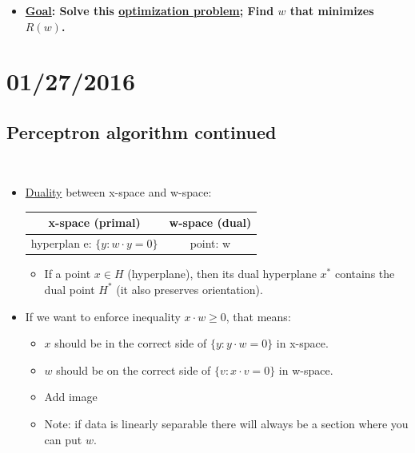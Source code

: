 \documentclass[10pt]{article}
\begin{document}
\begin{itemize}
			\item \textbf{\underline{Goal}: Solve this \underline{optimization problem}; Find $w$ that minimizes $R(w)$.}
	\end{itemize}

\newpage
\section*{01/27/2016}
	\subsection*{Perceptron algorithm continued}
	\
		\begin{itemize}
			\item \underline{Duality} between x-space and w-space:\\
				\begin{center}
					\begin{tabular}{ c|c}
  						x-space (primal) & w-space (dual) \\
  						\hline
  						hyperplan	e: $\{y: w \cdot y = 0\}$ & point: w \\
  						\hline
					\end{tabular}
				\end{center}
				\begin{itemize}
					\item If a point $x \in H$ (hyperplane), then its dual hyperplane $x^{*}$ contains the dual point $H^{*}$ (it also preserves orientation).
				\end{itemize}
			
			\item If we want to enforce inequality $x \cdot w \geq 0$, that means:
				\begin{itemize}
					\item $x$ should be in the correct side of $\{y: y \cdot w = 0\}$ in x-space.
					\item $w$ should be on the correct side of $\{v: x \cdot v = 0\}$ in w-space.
					\item Add image
					\item Note: if data is linearly separable there will always be a section where you can put $w$.
				\end{itemize}
		\end{itemize}
\end{document}
